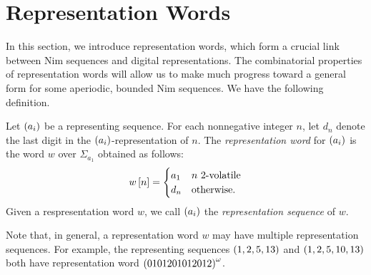 \documentclass[english,12pt]{article}
\newcommand{\seq}{\p}
\begin{document}
\section{Representation Words}\label{s:traceable}
In this section, we introduce representation words, which form a crucial link between Nim sequences and digital representations.  The combinatorial properties of representation words will allow us to make much progress toward a general form for some aperiodic, bounded Nim sequences.  We have the following definition.
\begin{defin}
Let $\seq{a_i}$ be a representing sequence.  For each nonnegative integer $n$, let $d_n$ denote the last digit in the $\seq{a_i}$-representation of $n$.  The \emph{representation word} for $\seq{a_i}$ is the word $w$ over $\Sigma_{a_1}$ obtained as follows:
\[
w\left[n\right]=\begin{cases}
a_1 & n\text{ $2$-volatile}\\
d_n & \text{otherwise}.
\end{cases}
\]
Given a respresentation word $w$, we call $\seq{a_i}$ the \emph{representation sequence} of $w$.
\end{defin}
Note that, in general, a representation word $w$ may have multiple representation sequences.  For example, the representing sequences $\left(1,2,5,13\right)$ and $\left(1,2,5,10,13\right)$ both have representation word $\left(0101201012012\right)^\omega$.
\end{document}
